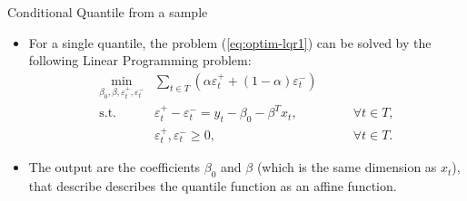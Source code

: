 \begin{frame}{Conditional Quantile from a sample}

\begin{itemize}
\tightlist
\item
  For a single quantile, the problem (\ref{eq:optim-lqr1}) can be solved
  by the following Linear Programming problem: \[
  \begin{array}{lll}
   \underset{\beta_0, \beta,\varepsilon_{t}^{+}, \varepsilon_{t}^{-}}{\text{min}} & \sum_{t \in T} \left(\alpha \varepsilon_{t}^{+}+(1-\alpha)\varepsilon_{t}^{-}\right) & \\
  \mbox{s.t. } & \varepsilon_{t}^{+}-\varepsilon_{t}^{-}=y_{t} - \beta_{0} - \beta^T x_{t}, & \qquad\forall t \in T,\\
  & \varepsilon_t^+,\varepsilon_t^- \geq 0, & \qquad \forall t \in T.
  \end{array}
  \]
\item
  The output are the coefficients \(\beta_0\) and \(\beta\) (which is
  the same dimension as \(x_t\)), that describe describes the quantile
  function as an affine function.
\end{itemize}

\end{frame}

